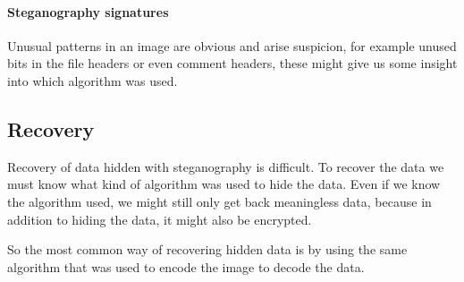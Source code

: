 \paragraph*{Steganography signatures}
Unusual patterns in an image are obvious and arise suspicion, for example unused bits in the file headers or even comment headers, these might give us some insight into which algorithm was used.

\subsection{Recovery}
Recovery of data hidden with steganography is difficult. To recover the data we must know what kind of algorithm was used to hide the data.
Even if we know the algorithm used, we might still only get back meaningless data, because in addition to hiding the data, it might also be encrypted.

So the most common way of recovering hidden data is by using the same algorithm that was used to encode the image to decode the data.
